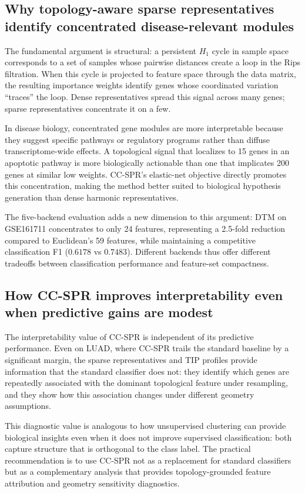 \documentclass[11pt]{article}
\begin{document}
\subsection{Why topology-aware sparse representatives identify concentrated disease-relevant modules}

The fundamental argument is structural: a persistent $H_1$ cycle in sample space corresponds to a set of samples whose pairwise distances create a loop in the Rips filtration.
When this cycle is projected to feature space through the data matrix, the resulting importance weights identify genes whose coordinated variation ``traces'' the loop.
Dense representatives spread this signal across many genes; sparse representatives concentrate it on a few.

In disease biology, concentrated gene modules are more interpretable because they suggest specific pathways or regulatory programs rather than diffuse transcriptome-wide effects.
A topological signal that localizes to 15 genes in an apoptotic pathway is more biologically actionable than one that implicates 200 genes at similar low weights.
CC-SPR's elastic-net objective directly promotes this concentration, making the method better suited to biological hypothesis generation than dense harmonic representatives.

The five-backend evaluation adds a new dimension to this argument: DTM on GSE161711 concentrates to only 24 features, representing a 2.5-fold reduction compared to Euclidean's 59 features, while maintaining a competitive classification F1 ($0.6178$ vs $0.7483$).
Different backends thus offer different tradeoffs between classification performance and feature-set compactness.

\subsection{How CC-SPR improves interpretability even when predictive gains are modest}

The interpretability value of CC-SPR is independent of its predictive performance.
Even on LUAD, where CC-SPR trails the standard baseline by a significant margin, the sparse representatives and TIP profiles provide information that the standard classifier does not: they identify which genes are repeatedly associated with the dominant topological feature under resampling, and they show how this association changes under different geometry assumptions.

This diagnostic value is analogous to how unsupervised clustering can provide biological insights even when it does not improve supervised classification: both capture structure that is orthogonal to the class label.
The practical recommendation is to use CC-SPR not as a replacement for standard classifiers but as a complementary analysis that provides topology-grounded feature attribution and geometry sensitivity diagnostics.
\end{document}
